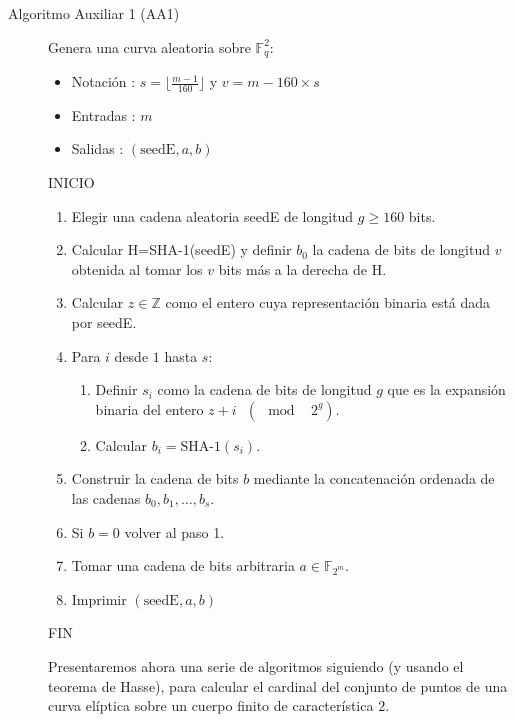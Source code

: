 \documentclass[11pt]{article}
\newcommand{\Z}{\mathbb{Z}}
\newcommand{\F}{\mathbb{F}}
\numberwithin{equation}{section} %
\numberwithin{figure}{section} %
\numberwithin{table}{section} %
\begin{document}
		\begin{description}%
		
		
			\item[Algoritmo Auxiliar 1 (AA1)] Genera una curva aleatoria sobre $\F_q^2$:%
			\begin{itemize}
				\item Notación : $s=\lfloor\frac{m -1}{160}\rfloor$ y $v=m-160\times s$
				\item Entradas : $m$
				\item Salidas : $(\text{seedE},a,b)$
			\end{itemize}
			INICIO
			\begin{enumerate}
				\item Elegir una cadena aleatoria seedE de longitud $g\geq160$ bits.
				\item Calcular H=SHA-1(seedE) y definir $b_0$ la cadena de bits de longitud $v$ obtenida al tomar los $v$ bits más a la derecha de H.
				\item Calcular $z\in \Z$ como el entero cuya representación binaria está dada por seedE.
				\item Para $i$ desde $1$ hasta $s$:
				\begin{enumerate}
					\item Definir $s_i$ como la cadena de bits de longitud $g$ que es la expansión binaria del entero $z+i\text{ }(\mod\text{ }2^g)$.
					\item Calcular $b_i=\text{SHA-1}(s_i)$.
				\end{enumerate}
				\item Construir la cadena de bits $b$ mediante la concatenación ordenada de las cadenas $b_0,b_1,\ldots,b_s$.
				\item Si $b=0$ volver al paso 1.
				\item Tomar una cadena de bits arbitraria $a\in \F_{2^m}$.
				\item Imprimir $(\text{seedE},a,b)$
			\end{enumerate}
			FIN
			

	Presentaremos ahora una serie de algoritmos siguiendo \cite{FGH} (y usando el teorema de Hasse), para calcular el cardinal del conjunto de puntos de una curva elíptica sobre un cuerpo finito de característica $2$.



\end{description}
\end{document}
